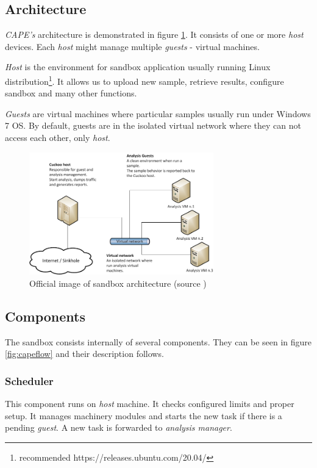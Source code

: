 \subsection{Architecture}
\emph{CAPE's} architecture is demonstrated in figure \ref{fig:capearchitecture}. It consists of one or more \emph{host} devices. Each \emph{host} might manage multiple \emph{guests} - virtual machines. 

\emph{Host} is the environment for sandbox application usually running Linux distribution\footnote{recommended https://releases.ubuntu.com/20.04/}. It allows us to upload new sample, retrieve results, configure sandbox and many other functions.

\emph{Guests} are virtual machines where particular samples usually run under Windows 7 OS. By default, guests are in the isolated virtual network where they can not access each other, only \emph{host}.

\begin{figure}[h]
  \centering
  \includegraphics[width=8cm]{figures/architecture.png}
  \caption{Official image of sandbox architecture (source \cite{CAPESand75:online})}
  \label{fig:capearchitecture}
\end{figure}


\subsection{Components}
The sandbox consists internally of several components. They can be seen in figure \ref{fig:capeflow} and their description follows.

\subsubsection*{Scheduler}
This component runs on \emph{host} machine. It checks configured limits and proper setup. It manages machinery modules and starts the new task if there is a pending \emph{guest}. A new task is forwarded to \emph{analysis manager}.

